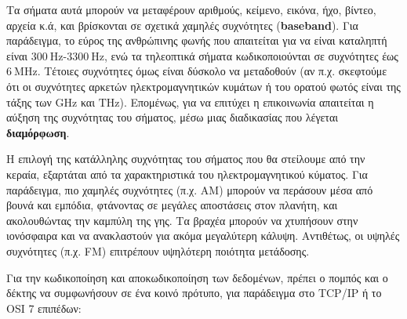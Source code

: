 \documentclass[11pt,a4paper,notitlepage,fleqn]{article}
\begin{document}
Τα σήματα αυτά μπορούν να μεταφέρουν αριθμούς, κείμενο, εικόνα, ήχο, βίντεο, αρχεία κ.ά, και
βρίσκονται σε σχετικά χαμηλές συχνότητες (\textbf{baseband}). Για παράδειγμα, το εύρος της ανθρώπινης φωνής που
απαιτείται για να είναι καταληπτή είναι \( 300 \ \mathrm{Hz} \)-\( 3300\ \mathrm{Hz} \), ενώ
τα τηλεοπτικά σήματα κωδικοποιούνται σε συχνότητες έως \( 6 \ \mathrm{MHz} \). Τέτοιες
συχνότητες όμως είναι δύσκολο να μεταδοθούν (αν π.χ. σκεφτούμε ότι οι συχνότητες αρκετών
ηλεκτρομαγνητικών κυμάτων ή του ορατού φωτός είναι της τάξης των \( \mathrm{GHz} \) και
\( \mathrm{THz} \)). Επομένως, για να επιτύχει η επικοινωνία απαιτείται η αύξηση της
συχνότητας του σήματος, μέσω μιας διαδικασίας που λέγεται \textbf{διαμόρφωση}.


Η επιλογή της κατάλληλης συχνότητας του σήματος που θα στείλουμε από την κεραία, εξαρτάται
από τα χαρακτηριστικά του ηλεκτρομαγνητικού κύματος. Για παράδειγμα, πιο χαμηλές συχνότητες
(π.χ. AM) μπορούν να περάσουν μέσα από βουνά και εμπόδια, φτάνοντας σε μεγάλες αποστάσεις
στον πλανήτη, και ακολουθώντας την καμπύλη της γης. Τα βραχέα μπορούν να χτυπήσουν στην
ιονόσφαιρα και να ανακλαστούν για ακόμα μεγαλύτερη κάλυψη. Αντιθέτως, οι υψηλές συχνότητες
(π.χ. FM) επιτρέπουν υψηλότερη ποιότητα μετάδοσης.

Για την κωδικοποίηση και αποκωδικοποίηση των δεδομένων, πρέπει ο πομπός και ο δέκτης να
συμφωνήσουν σε ένα κοινό πρότυπο, για παράδειγμα στο TCP/IP ή το OSI 7 επιπέδων:
\end{document}
